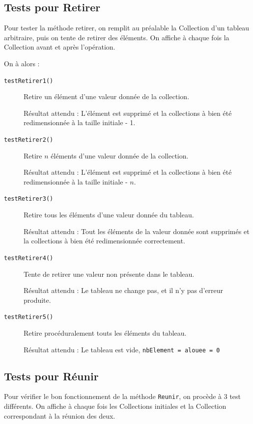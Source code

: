 \documentclass[11pt]{article}
\begin{document}
\subsection{Tests pour Retirer}	
Pour tester la méthode retirer, on remplit au préalable la Collection d'un tableau arbitraire, puis on tente de retirer des éléments. On affiche à chaque fois la Collection avant et après l'opération.

On à alors :
\begin{description}
	\item[\texttt{testRetirer1()}] Retire un élément d'une valeur donnée de la collection.
	
	Résultat attendu : L'élément est supprimé et la collections à bien été redimensionnée à la taille initiale - 1.
	
	\item[\texttt{testRetirer2()}] Retire $n$ éléments d'une valeur donnée de la collection.
	
	Résultat attendu : L'élément est supprimé et la collections à bien été redimensionnée à la taille initiale - $n$.
	
	\item[\texttt{testRetirer3()}] Retire tous les éléments d'une valeur donnée du tableau.
	
	Résultat attendu : Tout les éléments de la valeur donnée sont supprimés et la collections à bien été redimensionnée correctement.
	
	\item[\texttt{testRetirer4()}] Tente de retirer une valeur non présente dans le tableau.
	
	Résultat attendu : Le tableau ne change pas, et il n'y pas d'erreur produite.
	
	\item[\texttt{testRetirer5()}] Retire procéduralement touts les éléments du tableau.
	
	Résultat attendu : Le tableau est vide, \texttt{nbElement = alouee = 0}
\end{description}

\subsection{Tests pour Réunir}
Pour vérifier le bon fonctionnement de la méthode \texttt{Reunir}, on procède à 3 test différents. On affiche à chaque fois les Collections initiales et la Collection correspondant à la réunion des deux.
\end{document}
